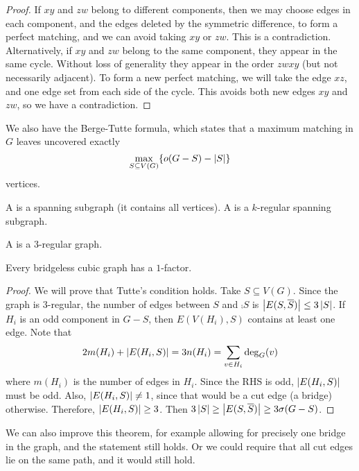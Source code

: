 \begin{proof}
  If $xy$ and $zw$ belong to different components, then we may choose edges in
  each component, and the edges deleted by the symmetric difference, to form a
  perfect matching, and we can avoid taking $xy$ or $zw$.
  This is a contradiction.
  Alternatively, if $xy$ and $zw$ belong to the same component, they appear in
  the same cycle.
  Without loss of generality they appear in the order $zwxy$ (but not
  necessarily adjacent).
  To form a new perfect matching, we will take the edge $xz$, and one edge set
  from each side of the cycle.
  This avoids both new edges $xy$ and $zw$, so we have a contradiction.
\end{proof}

We also have the Berge-Tutte formula, which states that a maximum matching in
$G$ leaves uncovered exactly
\[
  \max_{S \subseteq V(G)} \{o(G - S) - \left| S \right|\}
\]
vertices.


\begin{definition}
  A  is a spanning subgraph (it contains all vertices).
  A  is a $k$-regular spanning subgraph.
\end{definition}

\begin{definition}
  A  is a $3$-regular graph.
\end{definition}

\begin{theorem}[Petersen]
  Every bridgeless cubic graph has a $1$-factor.
\end{theorem}

\begin{proof}
  We will prove that Tutte's condition holds.
  Take $S \subseteq V(G)$.
  Since the graph is $3$-regular, the number of edges between $S$ and $\comp{S}$
  is $\left| E(S,\overline{S}) \right| \le 3 \left| S \right|$.
  If $H_i$ is an odd component in $G - S$, then $E(V(H_i), S)$ contains at least
  one edge.
  Note that
  \[
	2 m(H_i) + \left| E(H_i, S) \right| = 3 n(H_i) = \sum_{v \in H_i} \deg_G(v)
  \]
  where $m(H_i)$ is the number of edges in $H_i$.
  Since the RHS is odd, $\left| E(H_i, S) \right|$ must be odd.
  Also, $\left| E(H_i, S) \right| \ne 1$, since that would be a cut edge (a bridge)
  otherwise.
  Therefore, $\left| E(H_i, S) \right| \ge 3$.
  Then $3 \left| S \right| \ge \left| E(S, \overline{S}) \right| \ge 3 \sigma(G - S)$.
\end{proof}

We can also improve this theorem, for example allowing for precisely one bridge
in the graph, and the statement still holds.
Or we could require that all cut edges lie on the same path, and it would still
hold.

